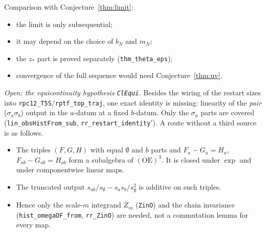 \documentclass[11pt]{amsart}
\theoremstyle{definition}
\theoremstyle{remark}
\numberwithin{equation}{section}
\begin{document}
Comparison with Conjecture~\ref{thm:limit}:
\begin{itemize}
\item the limit is only subsequential;
\item it may depend on the choice of $b_N$ and $m_N$;
\item the $z_*$ part is proved separately (\texttt{thm\_theta\_eps});
\item convergence of the full sequence would need Conjecture~\ref{thm:uv}.
\end{itemize}
\emph{Open: the equicontinuity hypothesis \texttt{ClEqui}.} Besides the wiring of the restart sizes into
\texttt{rpc12\_T5S}/\texttt{rptf\_top\_traj}, one exact identity is missing: linearity of the
\emph{pair} ($\sigma_a\sigma_b$) output in the $a$-datum at a fixed $b$-datum. Only the $\sigma_a$ parts are covered
(\texttt{lin\_obsHistFrom\_sub}, \texttt{rr\_restart\_identity$'$}). A route without a third source is as follows.
\begin{itemize}
\item The triples $(F,G,H)$ with equal $\emptyset$ and $b$ parts and $F_a-G_a=H_a$, $F_{ab}-G_{ab}=H_{ab}$ form a
subalgebra of $(\mathrm{OE})^3$. It is closed under $\exp$ and under componentwise linear maps.
\item The truncated output $s_{ab}/s_\emptyset-s_as_b/s_\emptyset^2$ is additive on such triples.
\item Hence only the scale-$m$ integrand $Z_m$ (\texttt{ZinO}) and the chain invariance
(\texttt{hist\_omegaOF\_from}, \texttt{rr\_ZinO}) are needed, not a commutation lemma for every map.
\end{itemize}
\end{document}
